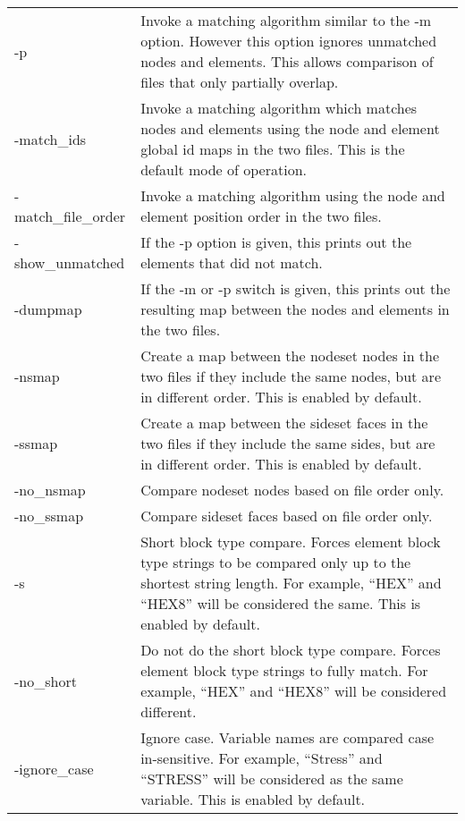 \begin{longtable}{lp{4.0in}}
-p & Invoke a matching algorithm similar to the -m option.  However
	this option ignores unmatched nodes and elements.  This allows
	comparison of files that only partially overlap. \\

-match\_ids & Invoke a matching algorithm which matches nodes and elements using the node and element
        global id maps in the two files. This is the default
        mode of operation.\\

-match\_file\_order & Invoke a matching algorithm using the node and element
        position order in the two files. \\

-show\_unmatched & If the -p option is given, this prints out the
        elements that did not match. \\

-dumpmap & If the -m or -p switch is given, this prints out the resulting
        map between the nodes and elements in the two files. \\

-nsmap & Create a map between the nodeset nodes in the two files
        if they include the same nodes, but are in different
        order. This is enabled by default.\\

-ssmap & Create a map between the sideset faces in the two files
        if they include the same sides, but are in different order.
        This is enabled by default.\\

-no\_nsmap & Compare nodeset nodes based on file order only. \\
-no\_ssmap & Compare sideset faces based on file order only. \\

-s & Short block type compare.  Forces element block type strings to
        be compared only up to the shortest string length.  For example,
        ``HEX'' and ``HEX8'' will be considered the same. This is enabled by default. \\

-no\_short & Do not do the short block type compare.  Forces element block
        type strings to fully match. For example, ``HEX'' and ``HEX8''
        will be considered different. \\

 -ignore\_case & Ignore case.  Variable names are compared case
	in-sensitive.  For example, ``Stress'' and ``STRESS'' will be
	considered as the same variable. This is enabled by default. \\


\end{longtable}
